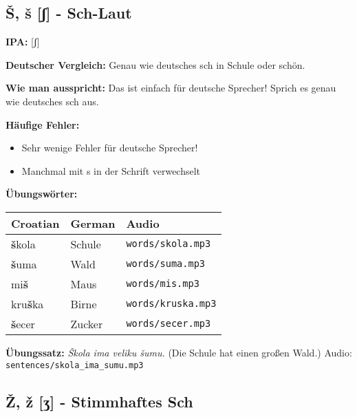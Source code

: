 \subsection{Š, š [ʃ] - \glqq Sch-Laut\grqq{}}

\begin{tcolorbox}[colback=lightblue!30, colframe=croatianblue, title=\textbf{Š, š}]

\textbf{IPA:} [ʃ]

\textbf{Deutscher Vergleich:}
Genau wie deutsches \glqq sch\grqq{} in \glqq Schule\grqq{} oder \glqq schön\grqq{}.

\textbf{Wie man ausspricht:}
Das ist einfach für deutsche Sprecher! Sprich es genau wie deutsches \glqq sch\grqq{} aus.

\textbf{Häufige Fehler:}
\begin{itemize}
    \item Sehr wenige Fehler für deutsche Sprecher!
    \item Manchmal mit \glqq s\grqq{} in der Schrift verwechselt
\end{itemize}

\textbf{Übungswörter:}
\begin{tabular}{lll}
\textbf{Croatian} & \textbf{German} & \textbf{Audio} \\
\midrule
\textbf{š}kola & Schule & \texttt{words/skola.mp3} \\
\textbf{š}uma & Wald & \texttt{words/suma.mp3} \\
mi\textbf{š} & Maus & \texttt{words/mis.mp3} \\
kru\textbf{š}ka & Birne & \texttt{words/kruska.mp3} \\
\textbf{š}ecer & Zucker & \texttt{words/secer.mp3} \\
\end{tabular}

\textbf{Übungssatz:}
\textit{Škola ima veliku šumu.}
(Die Schule hat einen großen Wald.)
Audio: \texttt{sentences/skola\_ima\_sumu.mp3}

\end{tcolorbox}

\subsection{Ž, ž [ʒ] - \glqq Stimmhaftes Sch\grqq{}}

